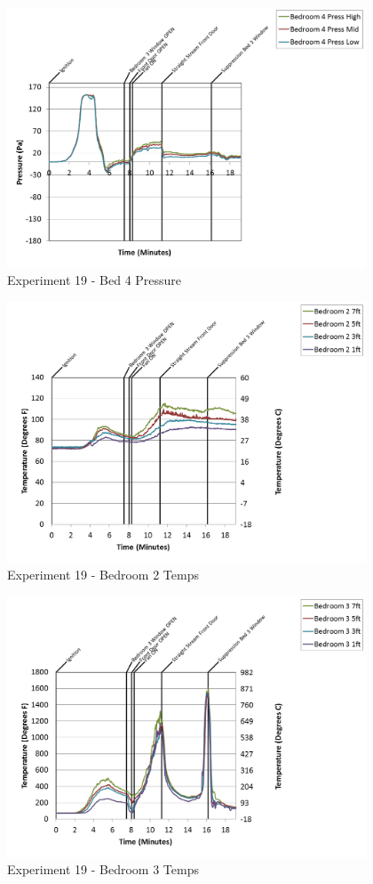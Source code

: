\documentclass{article}
\begin{document}
\begin{appendices}
\begin{figure}[h!]
	\centering
	\includegraphics[height=3.05in]{0_Images/Results_Charts/Exp_19_Charts/Bed4Pressure.png}
	\caption{Experiment 19 - Bed 4 Pressure}
\end{figure}

\clearpage

\begin{figure}[h!]
	\centering
	\includegraphics[height=3.05in]{0_Images/Results_Charts/Exp_19_Charts/Bedroom2Temps.png}
	\caption{Experiment 19 - Bedroom 2 Temps}
\end{figure}


\begin{figure}[h!]
	\centering
	\includegraphics[height=3.05in]{0_Images/Results_Charts/Exp_19_Charts/Bedroom3Temps.png}
	\caption{Experiment 19 - Bedroom 3 Temps}
\end{figure}


\end{appendices}
\end{document}
